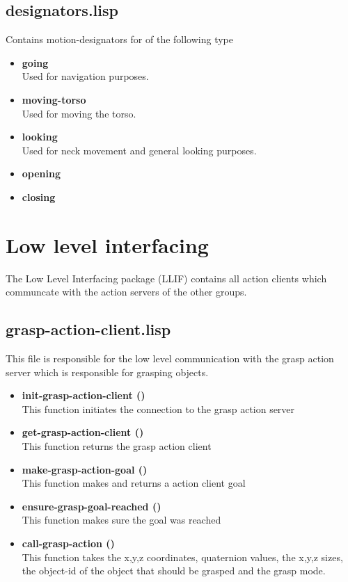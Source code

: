 \documentclass[main.tex]{subfiles}
\begin{document}
	    \subsection{designators.lisp}
	    Contains motion-designators for of the following type
	    \begin{itemize}
	    	\item \textbf{going} \\
		Used for navigation purposes.
		\item \textbf{moving-torso} \\
		Used for moving the torso.
		\item \textbf{looking} \\
		Used for neck movement and general looking purposes.
		\item \textbf{opening} \\
		
		\item \textbf{closing} \\
	    \end{itemize}

	  	\section{Low level interfacing}
	  	\label{llif}
		The Low Level Interfacing package (LLIF) contains all action clients which communcate with the action servers of the other groups.
		\subsection{grasp-action-client.lisp}
		This file is responsible for the low level communication with the
		grasp action server which is responsible for grasping objects.
		\begin{itemize}
			\item \textbf{init-grasp-action-client ()} \\
			This function initiates the connection to the grasp action server
			\item \textbf{get-grasp-action-client ()} \\
			This function returns the grasp action client
			\item \textbf{make-grasp-action-goal ()} \\
			This function makes and returns a action client goal
			\item \textbf{ensure-grasp-goal-reached ()} \\
            This function makes sure the goal was reached
			\item \textbf{call-grasp-action ()} \\
			This function takes the x,y,z coordinates, quaternion values, the x,y,z sizes, the object-id of the object that should be grasped and the grasp mode.
		\end{itemize}
\end{document}
